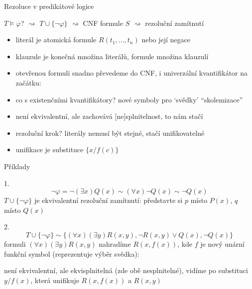 \documentclass{beamer}
\begin{document}
\begin{frame}{Rezoluce v predikátové logice}

    $T\models\varphi$? {\Large$\rightsquigarrow$} $T\cup\{\neg \varphi\}$ {\Large$\rightsquigarrow$} CNF formule $S$ {\Large$\rightsquigarrow$} rezoluční zamítnutí

    \begin{itemize}
        \item \alert{literál} je \alert{atomická formule} $R(t_1,\dots,t_n)$ nebo její negace
        \item \alert{klauzule} je konečná množina literálů, \alert{formule} množina klauzulí
        \item otevřenou formuli snadno převedeme do CNF, i univerzální kvantifikátor na začátku:{\small{}}
        \item co s existenčními kvantifikátory? nové symboly pro `svědky'
        {\small{}} ``\alert{skolemizace}''
        \item není ekvivalentní, ale zachovává \alert{[ne]splnitelnost}, to nám stačí
        \item rezoluční krok? literály nemusí být stejné, stačí \alert{unifikovatelné}
        {}
        \item \alert{unifikace} je substituce $\{x/f(c)\}$
    \end{itemize}

\end{frame}


\begin{frame}{Příklady}
    
    1. 
    $$\neg\varphi=\neg(\exists x)Q(x)\sim(\forall x)\neg Q(x)\sim\neg Q(x)$$ 
    $T\cup\{\neg \varphi\}$ je \alert{ekvivalentní} 
    rezoluční zamítnutí: představte si $p$ místo $P(x)$, $q$ místo $Q(x)$

    2. 
    $$
    T\cup\{\neg \varphi\}\sim\{(\forall x)(\exists y)R(x,y),\neg R(x,y)\lor Q(x),\neg Q(x)\}
    $$
    formuli \alert{$(\forall x)(\exists y)R(x,y)$} nahradíme \alert{$R(x,f(x))$}, kde $f$ je nový unární funkční symbol (reprezentuje \alert{výběr svědka}):


    není ekvivalentní, ale \alert{ekvisplnitelná} (zde obě nesplnitelné), vidíme po \alert{substituci $y/f(x)$}, která \alert{unifikuje} $R(x,f(x))$ a $R(x,y)$
 
\end{frame}
\end{document}
